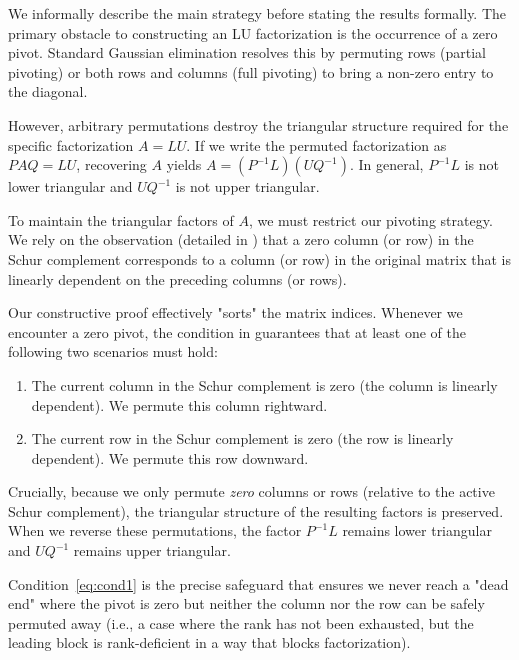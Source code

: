 \documentclass[final]{siamart1116}
\numberwithin{theorem}{section}
\DeclareMathOperator{\nl}{null}
\begin{document}

We informally describe the main strategy before stating the results formally. The primary obstacle to constructing an LU factorization is the occurrence of a zero pivot. Standard Gaussian elimination resolves this by permuting rows (partial pivoting) or both rows and columns (full pivoting) to bring a non-zero entry to the diagonal.

However, arbitrary permutations destroy the triangular structure required for the specific factorization $A=LU$. If we write the permuted factorization as $P A Q = L U$, recovering $A$ yields $A = (P^{-1} L) (U Q^{-1})$. In general, $P^{-1} L$ is not lower triangular and $U Q^{-1}$ is not upper triangular.

To maintain the triangular factors of $A$, we must restrict our pivoting strategy. We rely on the observation (detailed in ) that a zero column (or row) in the Schur complement corresponds to a column (or row) in the original matrix that is linearly dependent on the preceding columns (or rows).

Our constructive proof effectively "sorts" the matrix indices. Whenever we encounter a zero pivot, the condition in  guarantees that at least one of the following two scenarios must hold:
\begin{enumerate}
  \item The current column in the Schur complement is zero (the column is linearly dependent). We permute this column rightward.
  \item The current row in the Schur complement is zero (the row is linearly dependent). We permute this row downward.
\end{enumerate}

Crucially, because we only permute \emph{zero} columns or rows (relative to the active Schur complement), the triangular structure of the resulting factors is preserved. When we reverse these permutations, the factor $P^{-1} L$ remains lower triangular and $U Q^{-1}$ remains upper triangular.

Condition~\eqref{eq:cond1} is the precise safeguard that ensures we never reach a "dead end" where the pivot is zero but neither the column nor the row can be safely permuted away (i.e., a case where the rank has not been exhausted, but the leading block is rank-deficient in a way that blocks factorization).
\end{document}
